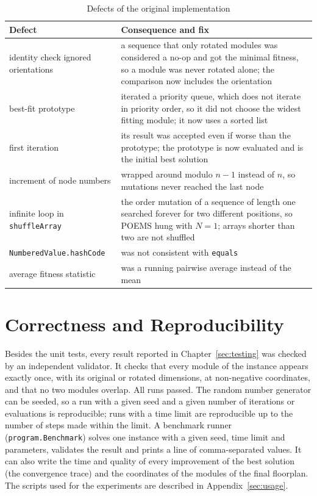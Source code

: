\begin{table}
\centering
\begin{tabularx}{\textwidth}{@{}lX@{}}
\toprule
Defect & Consequence and fix \\
\midrule
identity check ignored orientations & a sequence that only rotated modules was considered a no-op and got the minimal fitness, so a module was never rotated alone; the comparison now includes the orientation \\
best-fit prototype & iterated a priority queue, which does not iterate in priority order, so it did not choose the widest fitting module; it now uses a sorted list \\
first iteration & its result was accepted even if worse than the prototype; the prototype is now evaluated and is the initial best solution \\
increment of node numbers & wrapped around modulo $n-1$ instead of $n$, so mutations never reached the last node \\
infinite loop in {\tt shuffleArray} & the order mutation of a sequence of length one searched forever for two different positions, so POEMS hung with $N = 1$; arrays shorter than two are not shuffled \\
{\tt NumberedValue.hashCode} & was not consistent with {\tt equals} \\
average fitness statistic & was a running pairwise average instead of the mean \\
\bottomrule
\end{tabularx}
\caption{Defects of the original implementation}
\label{tab:defects}
\end{table}

\section{Correctness and Reproducibility}

Besides the unit tests, every result reported in Chapter~\ref{sec:testing} was checked by an independent validator. It checks that every module of the instance appears exactly once, with its original or rotated dimensions, at non-negative coordinates, and that no two modules overlap. All runs passed. The random number generator can be seeded, so a run with a given seed and a given number of iterations or evaluations is reproducible; runs with a time limit are reproducible up to the number of steps made within the limit. A benchmark runner ({\tt program.Benchmark}) solves one instance with a given seed, time limit and parameters, validates the result and prints a line of comma-separated values. It can also write the time and quality of every improvement of the best solution (the convergence trace) and the coordinates of the modules of the final floorplan. The scripts used for the experiments are described in Appendix~\ref{sec:usage}.

